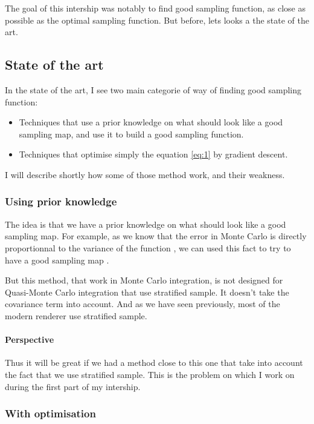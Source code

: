 \documentclass{classeENS}
\begin{document}
The goal of this intership was notably to find good sampling function, as close as 
possible as the optimal sampling function. But before, lets looks a the state of the art.

\subsection{State of the art}

In the state of the art, I see two main categorie of way of finding good sampling function:
\begin{itemize}
    \item Techniques that use a prior knowledge on what should look like a good sampling map, 
    and use it to build a good sampling function.
    \item Techniques that optimise simply the equation \ref{eq:1} by gradient descent.
\end{itemize}
I will describe shortly how some of those method work, and their weakness.

\subsubsection{Using prior knowledge}

\par The idea is that we have a prior knowledge on what should look like a good 
sampling map. For example, as we know that the error in Monte Carlo 
is directly proportionnal to the variance of the function \label{eq:variance},
we can used this fact to try to have a good sampling map \cite{10.1145/325165.325179}.

\par But this method, that work in Monte Carlo integration, is not designed for
Quasi-Monte Carlo integration that use stratified sample. It doesn't take the 
covariance term into account. 
And as we have seen previously, most of the modern renderer use stratified sample. 

\paragraph*{Perspective} Thus it will be great if we had a method close to this one that take into account
the fact that we use stratified sample. This is the problem on which I work on during the first
part of my intership.

\subsubsection{With optimisation}
\end{document}
